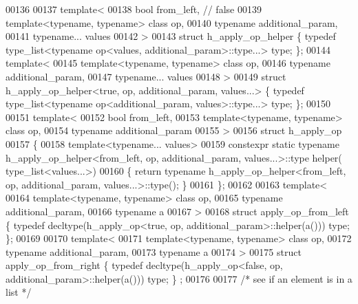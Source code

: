 \begin{DoxyCode}
00136 
00137 \textcolor{keyword}{template}<
00138   \textcolor{keywordtype}{bool} from\_left, \textcolor{comment}{// false}
00139   \textcolor{keyword}{template}<\textcolor{keyword}{typename}, \textcolor{keyword}{typename}> \textcolor{keyword}{class }op,
00140   \textcolor{keyword}{typename} additional\_param,
00141   \textcolor{keyword}{typename}... values
00142 >
00143 \textcolor{keyword}{struct }h\_apply\_op\_helper                                        \{ \textcolor{keyword}{typedef} type\_list<typename op<values,
       additional\_param>::type...> type; \};
00144 \textcolor{keyword}{template}<
00145   \textcolor{keyword}{template}<\textcolor{keyword}{typename}, \textcolor{keyword}{typename}> \textcolor{keyword}{class }op,
00146   \textcolor{keyword}{typename} additional\_param,
00147   \textcolor{keyword}{typename}... values
00148 >
00149 \textcolor{keyword}{struct }h\_apply\_op\_helper<true, op, additional\_param, values...> \{ \textcolor{keyword}{typedef} type\_list<typename
       op<additional\_param, values>::type...> type; \};
00150 
00151 \textcolor{keyword}{template}<
00152   \textcolor{keywordtype}{bool} from\_left,
00153   \textcolor{keyword}{template}<\textcolor{keyword}{typename}, \textcolor{keyword}{typename}> \textcolor{keyword}{class }op,
00154   \textcolor{keyword}{typename} additional\_param
00155 >
00156 \textcolor{keyword}{struct }h\_apply\_op
00157 \{
00158   \textcolor{keyword}{template}<\textcolor{keyword}{typename}... values>
00159   constexpr \textcolor{keyword}{static} \textcolor{keyword}{typename} h\_apply\_op\_helper<from\_left, op, additional\_param, values...>::type helper(
      type\_list<values...>)
00160   \{ \textcolor{keywordflow}{return} \textcolor{keyword}{typename} h\_apply\_op\_helper<from\_left, op, additional\_param, values...>::type(); \}
00161 \};
00162 
00163 \textcolor{keyword}{template}<
00164   \textcolor{keyword}{template}<\textcolor{keyword}{typename}, \textcolor{keyword}{typename}> \textcolor{keyword}{class }op,
00165   \textcolor{keyword}{typename} additional\_param,
00166   \textcolor{keyword}{typename} a
00167 >
00168 \textcolor{keyword}{struct }apply\_op\_from\_left \{ \textcolor{keyword}{typedef} decltype(h\_apply\_op<true, op, additional\_param>::helper(a())) type; \};
00169 
00170 template<
00171   template<typename, typename> class op,
00172   typename additional\_param,
00173   typename a
00174 >
00175 struct apply\_op\_from\_right \{ \textcolor{keyword}{typedef} decltype(h\_apply\_op<false, op, additional\_param>::helper(a())) type; \}
      ;
00176 
00177 \textcolor{comment}{/* see if an element is in a list */}

\end{DoxyCode}
